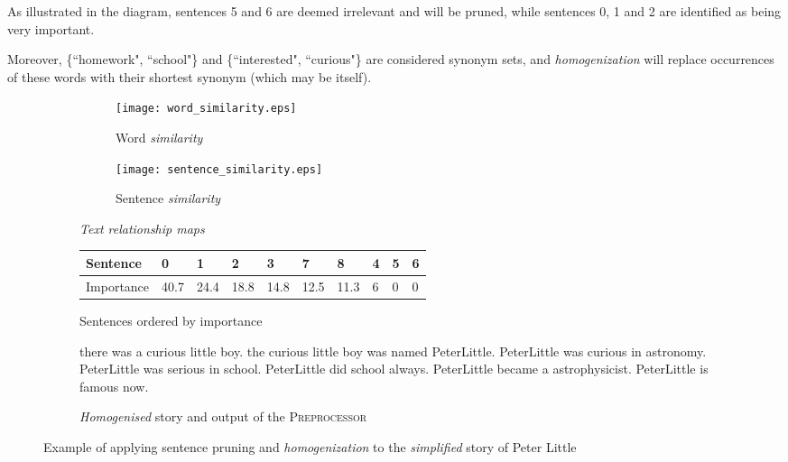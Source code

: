 As illustrated in the diagram, sentences 5 and 6 are deemed irrelevant and will be pruned, while sentences 0, 1 and 2 are identified as being very important.

Moreover, \{``homework", ``school"\} and \{``interested", ``curious"\} are considered synonym sets, and \textit{homogenization} will replace occurrences of these words with their shortest synonym (which may be itself).

\begin{figure}[H]
\begin{subfigure}{\textwidth}
\begin{subfigure}{0.5\textwidth}
\renewcommand\thesubfigure{\roman{subfigure}}
\texttt{[image: word\_similarity.eps]}
\caption{Word \textit{similarity}}
\end{subfigure}
\begin{subfigure}{0.5\textwidth}
\renewcommand\thesubfigure{\roman{subfigure}}
\texttt{[image: sentence\_similarity.eps]}
\caption{Sentence \textit{similarity}}
\end{subfigure}
\setcounter{subfigure}{0}
\caption{\textit{Text relationship maps}}
\end{subfigure}
\begin{subfigure}{\textwidth}
\vspace{\baselineskip}
\centering
\begin{tabular}{@{}llllllllll@{}}
\toprule
Sentence   & 0    & 1    & 2    & 3    & 7    & 8    & 4 & 5 & 6 \\ \midrule
Importance & 40.7 & 24.4 & 18.8 & 14.8 & 12.5 & 11.3 & 6 & 0 & 0 \\ \bottomrule
\end{tabular}
\caption{Sentences ordered by importance}
\end{subfigure}
\begin{subfigure}{\textwidth}
\vspace{\baselineskip}
\begin{displayquote}
there was a curious little boy. the curious little boy was named PeterLittle. PeterLittle was curious in astronomy. PeterLittle was serious in school. PeterLittle did school always. PeterLittle became a astrophysicist. PeterLittle is famous now.
\end{displayquote}
\caption{\textit{Homogenised} story and output of the \textsc{Preprocessor}}
\end{subfigure}
\caption{Example of applying sentence pruning and \textit{homogenization} to the \textit{simplified} story of Peter Little}
\label{fig:preprocessor_example}
\end{figure}